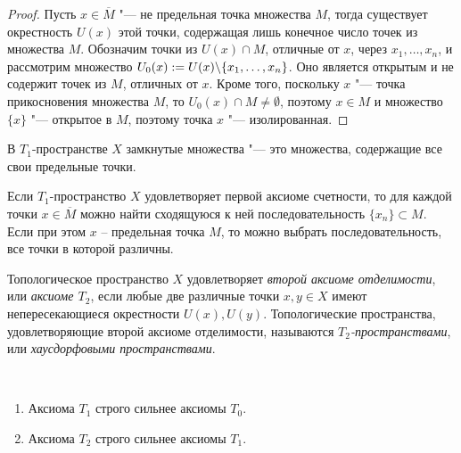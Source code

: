 \begin{proof}
    Пусть $x \in \overline{M}$ "--- не предельная точка множества $M$, тогда существует окрестность $U(x)$ этой точки, содержащая лишь конечное число точек из множества $M$. Обозначим точки из $U(x) \cap M$, отличные от $x$, через $x_1, \dotsc, x_n$, и рассмотрим множество $U_0(x) := U(x) \backslash \{x_1, \dotsc, x_n\}$. Оно является открытым и не содержит точек из $M$, отличных от $x$. Кроме того, поскольку $x$ "--- точка прикосновения множества $M$, то $U_0(x) \cap M \ne \emptyset$, поэтому $x \in M$ и множество $\{x\}$ "--- открытое в $M$, поэтому точка $x$ "--- изолированная.
\end{proof}

\begin{corollary}
    В $T_1$-пространстве $X$ замкнутые множества "--- это множества, содержащие все свои предельные точки.
\end{corollary}

\begin{note}
    Если $T_1$-пространство $X$ удовлетворяет первой аксиоме счетности, то для каждой точки $x \in \overline{M}$ можно найти сходящуюся к ней последовательность $\{x_n\} \subset M$. Если при этом $x$ -- предельная точка $M$, то можно выбрать последовательность, все точки в которой различны. 
\end{note}

\begin{definition}
    Топологическое пространство $X$ удовлетворяет \textit{второй аксиоме отделимости}, или \textit{аксиоме $T_2$}, если любые две различные точки $x, y \in X$ имеют непересекающиеся окрестности $U(x), U(y)$. Топологические пространства, удовлетворяющие второй аксиоме отделимости, называются \textit{$T_2$-пространствами}, или \textit{хаусдорфовыми пространствами}.
\end{definition}

\begin{proposition}~
    \begin{enumerate}
        \item Аксиома $T_1$ строго сильнее аксиомы $T_0$.
        \item Аксиома $T_2$ строго сильнее аксиомы $T_1$.
    \end{enumerate}
\end{proposition}


